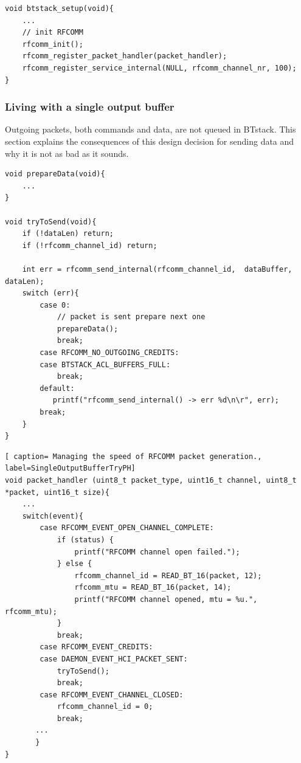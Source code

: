 \begin{lstlisting}[caption= RFCOMM service with automatic credit management. , label=automaticFlowControl]
void btstack_setup(void){
    ...
    // init RFCOMM
    rfcomm_init();
    rfcomm_register_packet_handler(packet_handler);
    rfcomm_register_service_internal(NULL, rfcomm_channel_nr, 100); 
}
\end{lstlisting}


\subsubsection{Living with a single output buffer}
\label{section:single_buffer}
Outgoing packets, both commands and data, are not queued in BTstack. This section explains the consequences of this design decision for sending data and why it is not as bad as it sounds.

\noindent\begin{minipage}{\textwidth}
\begin{lstlisting}[caption=Preparing and sending data., label=SingleOutputBufferTryToSend]
void prepareData(void){
    ...
}

void tryToSend(void){
    if (!dataLen) return;
    if (!rfcomm_channel_id) return;
    
    int err = rfcomm_send_internal(rfcomm_channel_id,  dataBuffer, dataLen);
    switch (err){
        case 0:
            // packet is sent prepare next one
            prepareData();
            break;
        case RFCOMM_NO_OUTGOING_CREDITS:
        case BTSTACK_ACL_BUFFERS_FULL:
            break;
        default:
           printf("rfcomm_send_internal() -> err %d\n\r", err);
        break;
    }
}
\end{lstlisting}
\begin{lstlisting}[ caption= Managing the speed of RFCOMM packet generation., label=SingleOutputBufferTryPH]
void packet_handler (uint8_t packet_type, uint16_t channel, uint8_t *packet, uint16_t size){
    ...
    switch(event){
        case RFCOMM_EVENT_OPEN_CHANNEL_COMPLETE:
            if (status) {
                printf("RFCOMM channel open failed.");
            } else {
                rfcomm_channel_id = READ_BT_16(packet, 12);
                rfcomm_mtu = READ_BT_16(packet, 14);
                printf("RFCOMM channel opened, mtu = %u.", rfcomm_mtu);
            }
            break;
        case RFCOMM_EVENT_CREDITS:
        case DAEMON_EVENT_HCI_PACKET_SENT:
            tryToSend();
            break;
        case RFCOMM_EVENT_CHANNEL_CLOSED:
            rfcomm_channel_id = 0;
            break;
       ...
       }
}
\end{lstlisting}
\end{minipage}

